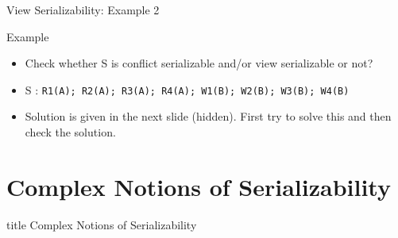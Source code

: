 \documentclass[aspectratio=169, xcolor=dvipsnames]{beamer}
\begin{document}
\begin{frame}{View Serializability: Example 2}
    \begin{exampleblock}{Example}
        \begin{itemize}[<+->]
            \item Check whether S is conflict serializable and/or view serializable or not?
            \item S : \texttt{R1(A); R2(A); R3(A); R4(A); W1(B); W2(B); W3(B); W4(B)}
            \item Solution is given in the next slide (hidden). First try to solve this and then check the solution.
        \end{itemize}
    \end{exampleblock}
\end{frame}

\section{Complex Notions of Serializability}

\begin{frame}
  \vfill
  \centering
  \begin{beamercolorbox}[sep=8pt,center,shadow=true,rounded=true]{title}
    Complex Notions of Serializability\par%
  \end{beamercolorbox}
  \vfill
\end{frame}
\end{document}
